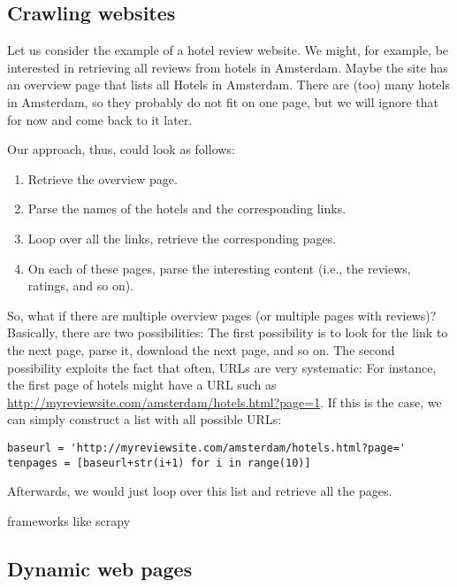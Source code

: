 



\subsection{Crawling websites}

Let us consider the example of a hotel review website. We might, for example, be interested in retrieving all reviews from hotels in Amsterdam.
Maybe the site has an overview page that lists all Hotels in Amsterdam. There are (too) many hotels in Amsterdam, so they probably do not fit on one page, but we will ignore that for now and come back to it later. 

Our approach, thus, could look as follows:

\begin{enumerate}
	\item Retrieve the overview page.
	\item Parse the names of the hotels and the corresponding links.
	\item Loop over all the links, retrieve the corresponding pages.
	\item On each of these pages, parse the interesting content (i.e., the reviews, ratings, and so on).
\end{enumerate}



So, what if there are multiple overview pages (or multiple pages with reviews)? Basically, there are two possibilities:
The first possibility is to look for the link to the next page, parse it, download the next page, and so on.
The second possibility exploits the fact that often, URLs are very systematic: For instance, the first page of hotels might have a URL such as \url{http://myreviewsite.com/amsterdam/hotels.html?page=1}.
If this is the case, we can simply construct a list with all possible URLs:
\begin{lstlisting}
baseurl = 'http://myreviewsite.com/amsterdam/hotels.html?page='
tenpages = [baseurl+str(i+1) for i in range(10)]
\end{lstlisting}
Afterwards, we would just loop over this list and retrieve all the pages.




frameworks like scrapy





\subsection{Dynamic web pages}
\label{sec:selenium}

